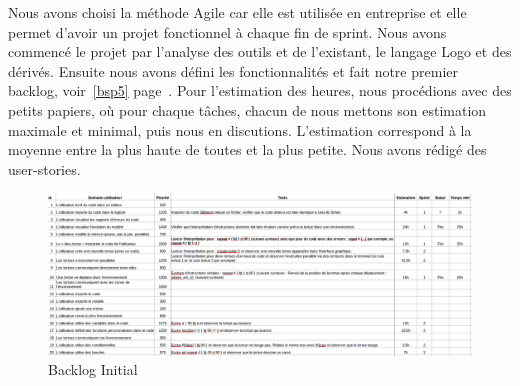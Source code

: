 Nous avons choisi la méthode Agile car elle est utilisée en entreprise et elle permet d'avoir un projet fonctionnel à chaque fin de sprint. Nous avons commencé le projet par l'analyse des outils et de l'existant, le langage Logo et des dérivés.
Ensuite nous avons défini les fonctionnalités et fait notre premier backlog, voir~\ref{bsp5} page~\pageref{bsp5}.
Pour l'estimation des heures, nous procédions avec des petits papiers, où pour chaque tâches, chacun de nous mettons son estimation maximale et minimal, puis nous en discutions. L'estimation correspond à la moyenne entre la plus haute de toutes et la plus petite.
Nous avons rédigé des user-stories.

\begin{figure}[h]
\caption{\label{bsp1} Backlog Initial}
\includegraphics[scale=0.35]{doc/gestionProjet/backlogv1.png}
\end{figure}

